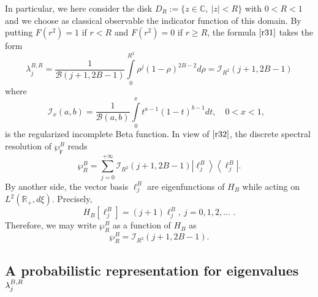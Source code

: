 In particular, we here consider the disk $D_{R}:=\{z\in \mathbb{C},\ |z|<R\}$
with $0<R<1$ and we choose as classical observable the indicator function of
this domain. By putting $F(r^{2})=1$ if $r<R$ and $F(r^{2})=0$ if $r\geq R$,
the formula $\eqref{r31} $ takes the form 
\begin{equation}
\label{r34}
\lambda _{j}^{B,R}=\frac{1}{\mathcal{B}(j+1,2B-1)}\int\limits_{0}^{R^{2}}%
\rho ^{j}(1-\rho )^{2B-2}d\rho =\mathcal{I}_{R^{2}}(j+1,2B-1)  
\end{equation}
where 
\begin{equation}
\label{r35}
\mathcal{I}_{x}(a,b)=\frac{1}{\mathcal{B}(a,b)}\int%
\limits_{0}^{x}t^{a-1}(1-t)^{b-1}dt,\quad 0<x<1,\text{ }  
\end{equation}
is the regularized incomplete Beta function. In view of $\eqref{r32}$, the discrete spectral resolution of $\wp _{\digamma }^{B}$
reads 
\begin{equation}
\label{r36}
\wp _{R}^{B}=\sum_{j=0}^{+\infty }\mathcal{I}_{R^{2}}(j+1,2B-1)\left\vert
\ell _{j}^{B}\right\rangle \left\langle \ell _{j}^{B}\right\vert . 
\end{equation}
By another side, the vector basis $\ell _{j}^{B}$ are eigenfunctions of $%
H_{B}$ while acting on $L^{2}\left( \mathbb{R}_{+},d\xi \right) $.
Precisely, 
\begin{equation}
\label{r37}
H_{B}\left[ \ell _{j}^{B}\right] =(j+1)\ell _{j}^{B},\ j=0,1,2,...\text{ .} 
\end{equation}
Therefore, we may write $\wp _{R}^{B}$ as a function of $H_{B}$ as 
\begin{equation}
\label{r38}
\wp _{R}^{B}=\mathcal{I}_{R^{2}}(j+1,2B-1).  
\end{equation}









\subsection{A probabilistic representation for eigenvalues $\protect\lambda %
_{j}^{B,R}$}

